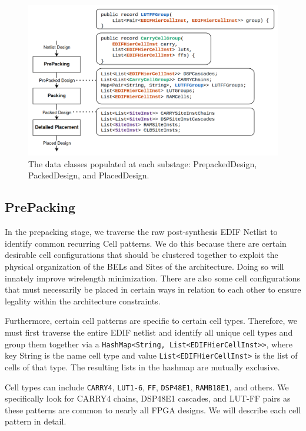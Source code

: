 \documentclass[twocolumn]{article}
\begin{document}
    \begin{figure}[t]
        \centering
        \includegraphics[width=14.0cm]{figures/substages.png}
        \caption{The data classes populated at each substage: PrepackedDesign, PackedDesign, and PlacedDesign.}
        \label{}
    \end{figure}

    \subsection{PrePacking}
        In the prepacking stage, we traverse the raw post-synthesis EDIF Netlist to identify common recurring Cell patterns. 
        We do this because there are certain desirable cell configurations that should be clustered together to exploit the physical organization of the BELs and Sites of the architecture. 
        Doing so will innately improve wirelength minimization. 
        There are also some cell configurations that must necessarily be placed in certain ways in relation to each other to ensure legality within the architecture constraints. 

        Furthermore, certain cell patterns are specific to certain cell types. 
        Therefore, we must first traverse the entire EDIF netlist and identify all unique cell types and group them together via a {\tt HashMap<String, List<EDIFHierCellInst>>}, where key String is the name cell type and value {\tt List<EDIFHierCellInst>} is the list of cells of that type. 
        The resulting lists in the hashmap are mutually exclusive. 

        Cell types can include {\tt CARRY4}, {\tt LUT1-6}, {\tt FF}, {\tt DSP48E1}, {\tt RAMB18E1}, and others. 
        We specifically look for CARRY4 chains, DSP48E1 cascades, and LUT-FF pairs as these patterns are common to nearly all FPGA designs. 
        We will describe each cell pattern in detail. 
\end{document}
